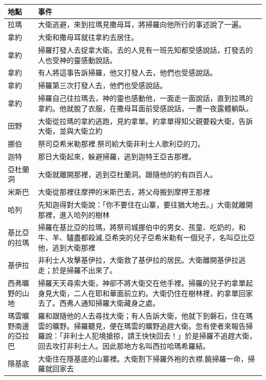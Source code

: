 \documentclass{ctexart}
\begin{document}
\begin{table}[!hbp]
\centering 
\begin{tabular}{|p{1.5cm}|p{15cm}|}
\hline
\hline
地點 & 事件\\\hline\hline
拉瑪 & 大衛逃避，來到拉瑪見撒母耳，將掃羅向他所行的事述說了一遍。 \\\hline
拿約 & 大衛和撒母耳就往拿約去居住。  \\\hline
拿約 & 掃羅打發人去捉拿大衛。去的人見有一班先知都受感說話，打發去的人也受神的靈感動說話。  \\\hline
拿約 & 有人將這事告訴掃羅，他又打發人去，他們也受感說話。 \\\hline
拿約  & 掃羅第三次打發人去，他們也受感說話。  \\\hline
拿約&掃羅自己往拉瑪去，神的靈也感動他，一面走一面說話，直到拉瑪的拿約。他就脫了衣服，在撒母耳面前受感說話，一晝一夜露體躺臥。\\\hline
田野 & 大衛從拉瑪的拿約逃跑，見約拿單。約拿單得知父親要殺大衛，告訴大衛，並與大衛立約 \\\hline
挪伯 &祭司亞希米勒那裡.祭司給大衛非利士人歌利亞的刀。\\\hline
迦特 &那日大衛起來，躲避掃羅，逃到迦特王亞吉那裡。 \\\hline
亞杜蘭洞 &大衛就離開那裡，逃到亞杜蘭洞。跟隨他的約有四百人。 \\\hline
米斯巴&大衛從那裡往摩押的米斯巴去，將父母搬到摩押王那裡 \\\hline
哈列&先知迦得對大衛說：「你不要住在山寨，要往猶大地去。」大衛就離開那裡，進入哈列的樹林\\\hline
基比亞的拉瑪&掃羅在基比亞的拉瑪，將祭司城挪伯中的男女、孩童、吃奶的，和牛、羊、驢盡都殺滅,亞希突的兒子亞希米勒有一個兒子，名叫亞比亞他，逃到大衛那裡\\\hline
基伊拉& 非利士人攻擊基伊拉，大衛救了基伊拉的居民。大衛離開基伊拉逃走；於是掃羅不出來了。\\\hline
西弗曠野的山地&掃羅天天尋索大衛，神卻不將大衛交在他手裡。掃羅的兒子約拿單起身見大衛，二人在耶和華面前立約。大衛仍住在樹林裡，約拿單回家去了。西弗人通知掃羅大衛藏身之處。 \\\hline
瑪雲曠野南邊的亞拉巴& 羅和跟隨他的人去尋找大衛；有人告訴大衛，他就下到磐石，住在瑪雲的曠野。掃羅聽見，便在瑪雲的曠野追趕大衛。忽有使者來報告掃羅說：「非利士人犯境搶掠，請王快快回去！」於是掃羅不追趕大衛，回去攻打非利士人。因此那地方名叫西拉哈瑪希羅結。  \\\hline
隱基底& 大衛住在隱基底的山寨裡。大衛割下掃羅外袍的衣襟,饒掃羅一命，掃羅就回家去\\\hline

\end{tabular}
\end{table}
\end{document}
